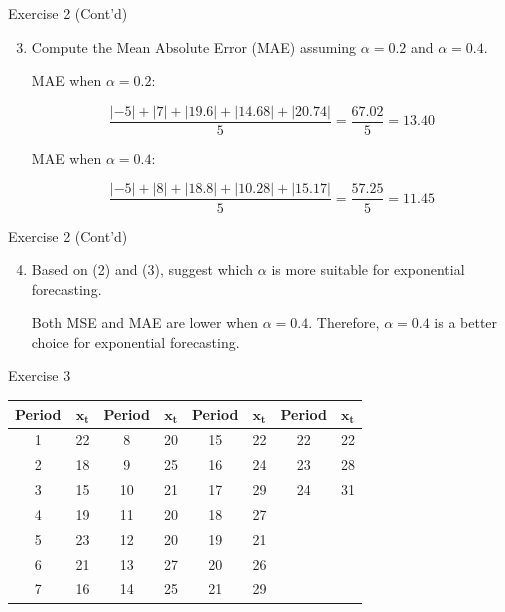 \documentclass[
  ignorenonframetext,
  aspectratio=43,
]{beamer}
\let\olditem\item
\renewcommand\item{\olditem\justifying}
\begin{document}
\begin{frame}{Exercise 2 (Cont'd)}
\protect\hypertarget{exercise-2-contd-3}{}
\begin{enumerate}
\setcounter{enumi}{2}
\item
  Compute the Mean Absolute Error (MAE) assuming \(\alpha = 0.2\) and
  \(\alpha = 0.4\).

  \pause

  MAE when \(\alpha = 0.2\): \vspace{-0.5cm}

  \pause

  \[
   \frac{|{-5}| + |7| + |19.6| + |14.68| + |20.74|}{5} = \frac{67.02}{5} = 13.40
   \]

  \pause

  MAE when \(\alpha = 0.4\): \vspace{-0.5cm}

  \pause

  \[
   \frac{|{-5}| + |8| + |18.8| + |10.28| + |15.17|}{5} = \frac{57.25}{5} = 11.45
   \]
\end{enumerate}
\end{frame}

\begin{frame}{Exercise 2 (Cont'd)}
\protect\hypertarget{exercise-2-contd-4}{}
\begin{enumerate}
\setcounter{enumi}{3}
\item
  Based on (2) and (3), suggest which \(\alpha\) is more suitable for
  exponential forecasting.

  \pause

  Both MSE and MAE are lower when \(\alpha = 0.4\). Therefore,
  \(\alpha = 0.4\) is a better choice for exponential forecasting.
\end{enumerate}
\end{frame}

\begin{frame}{Exercise 3}
\protect\hypertarget{exercise-3}{}
\begin{table}[h!]
\centering
\begin{tabular}{c c c c c c c c}
\toprule
\textbf{Period} & $\mathbf{x_t}$ &
\textbf{Period} & $\mathbf{x_t}$ &
\textbf{Period} & $\mathbf{x_t}$ &
\textbf{Period} & $\mathbf{x_t}$ \\
\midrule
1  & 22   & 8  & 20   & 15 & 22   & 22 & 22 \\
2  & 18   & 9  & 25   & 16 & 24   & 23 & 28 \\
3  & 15   & 10 & 21   & 17 & 29   & 24 & 31 \\
4  & 19   & 11 & 20   & 18 & 27   &     &    \\
5  & 23   & 12 & 20   & 19 & 21   &     &    \\
6  & 21   & 13 & 27   & 20 & 26   &     &    \\
7  & 16   & 14 & 25   & 21 & 29   &     &    \\
\bottomrule
\end{tabular}
\end{table}
\end{frame}
\end{document}
